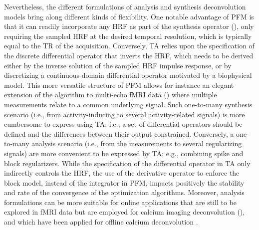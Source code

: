Nevertheless, the different formulations of analysis and synthesis deconvolution models bring along different kinds of flexibility. One notable advantage of PFM is that it can readily incorporate any HRF as part of the synthesis operator (\citealt{Elad2007Analysisversussynthesis}), only requiring the sampled HRF at the desired temporal resolution, which is typically equal to the TR of the acquisition. Conversely, TA relies upon the specification of the discrete differential operator that inverts the HRF, which needs to be derived either by the inverse solution of the sampled HRF impulse response, or by discretizing a continuous-domain differential operator motivated by a biophysical model. This more versatile structure of PFM allows for instance an elegant extension of the algorithm to multi-echo fMRI data (\citealt{CaballeroGaudes2019deconvolutionalgorithmmulti}) where multiple measurements relate to a common underlying signal. Such one-to-many synthesis scenario (i.e., from activity-inducing to several activity-related signals) is more cumbersome to express using TA; i.e., a set of differential operators should be defined and the differences between their output constrained. Conversely, a one-to-many analysis scenario (i.e., from the measurements to several regularizing signals) are more convenient to be expressed by TA; e.g., combining spike and block regularizers. 
While the specification of the differential operator in TA only indirectly controls the HRF, the use of the derivative operator to enforce the block model, instead of the integrator in PFM, impacts positively the stability and rate of the convergence of the optimization algorithms. Moreover, analysis formulations can be more suitable for online applications that are still to be explored in fMRI data but are employed for calcium imaging deconvolution (\citealt{Friedrich_2017,Jewell_2019}), and which have been applied for offline calcium deconvolution .

